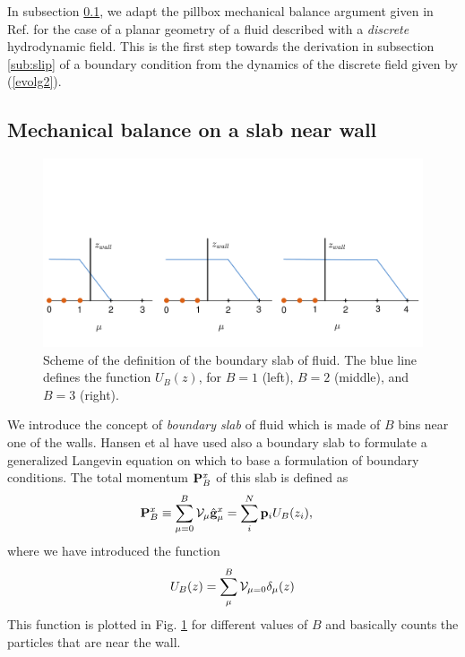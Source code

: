 \documentclass[b5paper,openright,10pt]{book}
\begin{document}
In subsection \ref{Sub:Mech}, we  adapt the pillbox mechanical balance
argument given in Ref.  \cite{CamargoBC2018} for  the case of a planar geometry of
a fluid  described with a \textit{discrete}  hydrodynamic field.  This
is the first step towards  the derivation in subsection \ref{sub:slip}
of a boundary condition from the  dynamics of the discrete field given
by (\ref{evolg2}).


\subsection{Mechanical balance on a slab near wall}
\label{Sub:Mech}

\begin{figure}[]
  \centering
  \includegraphics[width=\linewidth]{SchemeBSlab-3}
  \caption[Scheme of the definition of the boundary slab of fluid]{Scheme of the definition of the boundary slab of fluid. The blue line defines the function $U_{B}(z)$, for $B=1$ (left), $B=2$ (middle), and $B=3$ (right).}
\label{Fig.Slab}
\end{figure}

We introduce the  concept of \textit{boundary slab} of  fluid which is
made of $B$ bins near one of the walls. Hansen et al \cite{Hansen2011}
have used  also a  boundary slab to  formulate a  generalized Langevin
equation on which  to base a formulation of  boundary conditions.  The
total momentum ${\bf P}_B^x$ of this slab is defined as
\begin{align}
{\bf P}_B^x&\equiv  \sum^{B}_{\mu=0}{\cal    V}_\mu    \hat{\bf    g}^x_\mu=\sum_i^N{\bf    p}_iU_B(z_i),
\end{align}
where we have introduced the function
\begin{align}
  U_B(z)=\sum_\mu^{B}{\cal    V}_{\mu=0}\delta_\mu(z)  
\end{align}
This function is plotted  in Fig. \ref{Fig.Slab} for different values of $B$ and
basically counts the particles that are near the wall.
\end{document}
